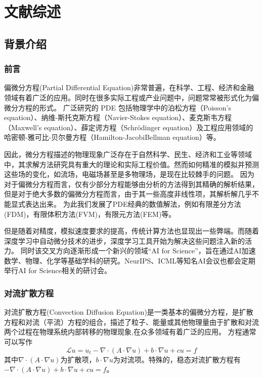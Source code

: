 \cleardoublepage
\chapter{文献综述}
\section{背景介绍}
\subsection{前言}

偏微分方程(Partial Differential Equation)非常普遍，在科学、工程、经济和金融领域有着广泛的应用。同时在很多实际工程或产业问题中，问题常常被形式化为偏微分方程的形式。
广泛研究的 PDE 包括物理学中的泊松方程（Poisson’s equation）、纳维-斯托克斯方程（Navier-Stokes equation）、麦克斯韦方程（Maxwell’s equation）、薛定谔方程（Schrödinger equation）及工程应用领域的哈密顿-雅可比-贝尔曼方程（Hamilton-JacobiBellman equation）等。

因此，微分方程描述的物理现象广泛存在于自然科学、民生、经济和工业等领域中，其求解方法研究具有重大的理论和实际工程价值。然而如何精准的模拟并预测这些场的变化，如流场，电磁场甚至是多物理场，是现在比较棘手的问题。
因为对于偏微分方程而言，仅有少部分方程能够由分析的方法得到其精确的解析结果，但是对于绝大多数的偏微分方程而言，由于其一些高度非线性项，其解析解几乎不能显式表达出来。
为此我们发展了PDE经典的数值解法，例如有限差分方法(FDM)，有限体积方法(FVM)，有限元方法(FEM)等。

但是随着对精度，模拟速度要求的提高，传统计算方法也显现出一些弊端。而随着深度学习中自动微分技术的进步，深度学习工具开始为解决这些问题注入新的活力。
同时该交叉方向逐渐形成一个新兴的领域“AI for Science”，旨在通过AI加速数学、物理、化学等基础学科的研究。NeurIPS、ICML等知名AI会议也都会定期举行AI for Science相关的研讨会。

\subsection{对流扩散方程}
对流扩散方程(Convection Diffusion Equation)是一类基本的偏微分方程，是扩散方程和对流（平流）方程的组合，描述了粒子、能量或其他物理量由于扩散和对流两个过程在物理系统内部转移的物理现象,在众多领域有着广泛的应用。
方程通常可以写作
$$\mathscr{L}u=u_t-\nabla\cdot (A\cdot \nabla u)+b\cdot \nabla u + cu=f$$
其中$\nabla\cdot (A\cdot \nabla u)$为扩散项，$b\cdot \nabla u$为对流项。特殊的，稳态对流扩散方程有$-\nabla\cdot (A\cdot \nabla u)+b\cdot \nabla u + cu=f$。

